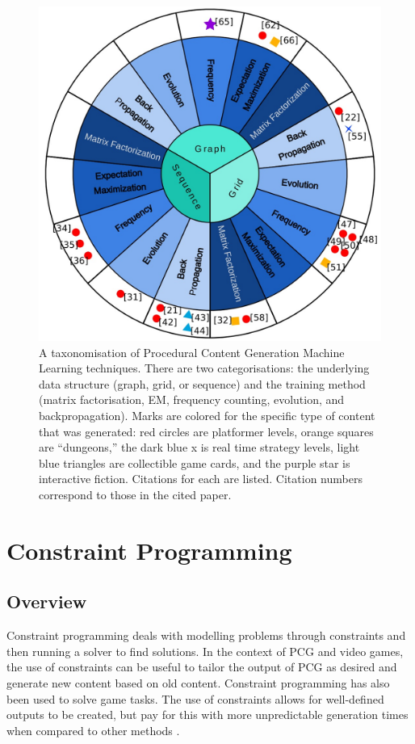 \begin{figure}[H]
    \centering
    \includegraphics[width=\textwidth, height=0.5\textheight, keepaspectratio]{Images/PCGMLTaxonomy.jpg}
    \caption{A taxonomisation of Procedural Content Generation Machine Learning techniques. There are two categorisations: the underlying data structure (graph, grid, or sequence) and the training method (matrix factorisation, EM, frequency counting, evolution, and backpropagation). Marks are colored for the specific type of content that was generated: red circles are platformer levels, orange squares are ``dungeons,'' the dark blue x is real time strategy levels, light blue triangles are collectible game cards, and the purple star is interactive fiction. Citations for each are listed. Citation numbers correspond to those in the cited paper. \cite{PCGML}}
    \label{fig:pcgml}
\end{figure}



\section{Constraint Programming}
\subsection{Overview}
Constraint programming deals with modelling problems through constraints and then running a solver to find solutions. In the context of PCG and video games, the use of constraints can be useful to tailor the output of PCG as desired and generate new content based on old content. Constraint programming has also been used to solve game tasks. The use of constraints allows for well-defined outputs to be created, but pay for this with more unpredictable generation times when compared to other methods \cite{WFC_In_The_Wild}.

